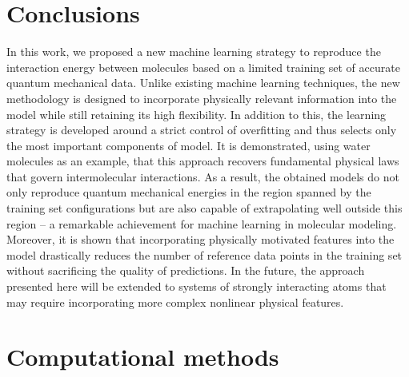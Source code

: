 \documentclass[aps,prl,reprint,amsmath,amssymb,nature]{revtex4-1}
\begin{document}
\section{Conclusions}

In this work, we proposed a new machine learning strategy to reproduce the interaction energy between molecules based on a limited training set of accurate quantum mechanical data. Unlike existing machine learning techniques, the new methodology is designed to incorporate physically relevant information into the model while still retaining its high flexibility. In addition to this, the learning strategy is developed around a strict control of overfitting and thus selects only the most important components of model. 
It is demonstrated, using water molecules as an example, that this approach recovers fundamental physical laws that govern intermolecular interactions. As a result, the obtained models do not only reproduce quantum mechanical energies in the region spanned by the training set configurations but are also capable of extrapolating well outside this region -- a remarkable achievement for machine learning in molecular modeling. Moreover, it is shown that incorporating physically motivated features into the model drastically reduces the number of reference data points in the training set without sacrificing the quality of predictions. 
In the future, the approach presented here will be extended to systems of strongly interacting atoms 
that may require incorporating more complex nonlinear physical features. 


\section{Computational methods}
\end{document}
